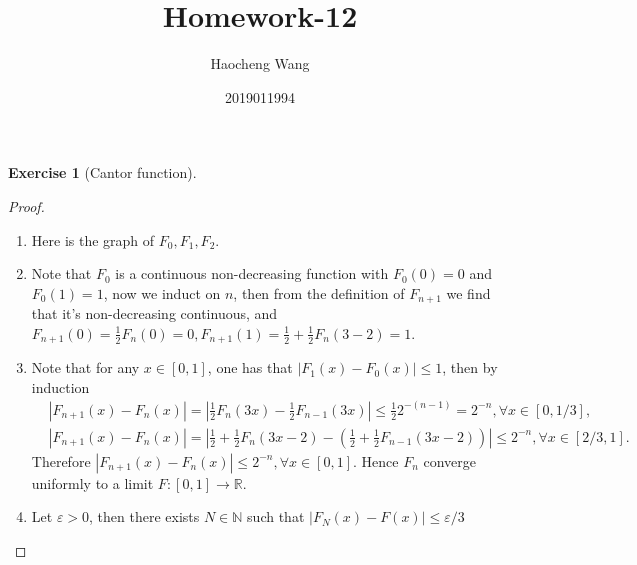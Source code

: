 \documentclass[a4paper]{article}
\title{Homework-12}
\author{Haocheng Wang \and 2019011994}
\newtheorem{ex}{Exercise}[subsection]
\begin{document}
\maketitle
\setcounter{ex}{47}
\begin{ex}[Cantor function]\end{ex}\begin{proof}\ \begin{enumerate}[label = (\roman*)]
    \item Here is the graph of $F_0, F_1, F_2$.\begin{center}
\end{center}
    \item Note that $F_0$ is a continuous non-decreasing function with $F_0(0) = 0$ and $F_0(1) = 1$, now we induct
    on $n$, then from the definition of $F_{n + 1}$ we find that it's non-decreasing continuous, and 
    $F_{n + 1}(0) = \frac{1}{2}F_n(0) = 0, F_{n + 1}(1) = \frac{1}{2} + \frac{1}{2}F_n(3-2) = 1$.
    \item Note that for any $x \in [0, 1]$, one has that $|F_1(x) - F_0(x)| \leq 1$, then 
    by induction\begin{align*}
    &|F_{n + 1}(x) - F_n(x)| = |\frac{1}{2}F_n(3x) - \frac{1}{2}F_{n - 1}(3x)| \leq \frac{1}{2}2^{-(n - 1)} = 2^{-n}, \forall x \in [0, 1/3],\\
    &|F_{n + 1}(x) - F_n(x)| = |\frac{1}{2} + \frac{1}{2}F_n(3x - 2) - (\frac{1}{2} + \frac{1}{2}F_{n - 1}(3x - 2))|
    \leq  2^{-n}, \forall x \in [2/3, 1].
    \end{align*}
    Therefore $|F_{n + 1}(x) - F_n(x)| \leq 2^{-n}, \forall x \in [0, 1]$. Hence $F_n$ converge uniformly to a limit 
    $F : [0, 1] \to \mathbb{R}$.
    \item Let $\varepsilon > 0$, then there exists $N \in \mathbb{N}$ such that $|F_N(x) - F(x)| \leq \varepsilon/3$

\end{enumerate}
\end{proof}
\end{document}
